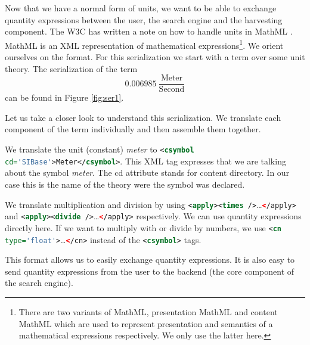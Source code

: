 Now that we have a normal form of units, we want to be able to exchange quantity expressions between the user, the search engine and the harvesting component. The W3C has written a note on how to handle units in MathML \cite{W3C:Unitnnote}. MathML is an XML representation of mathematical expressions\footnote{There are two variants of MathML, presentation MathML and content MathML which are used to represent presentation and semantics of a mathematical expressions respectively. We only use the latter here. }. We orient ourselves on the format. For this serialization we start with a term over some unit theory. The serialization of the term
\[0.006985\ \frac{\text{Meter}}{\text{Second}}\]
can be found in Figure \ref{fig:ser1}.

Let us take a closer look to understand this serialization. We translate each component of the term individually and then assemble them together.

We translate the unit (constant) \textit{meter} to \lstinline[language=XML]{<csymbol cd='SIBase'>Meter</csymbol>}. This XML tag expresses that we are talking about the symbol \textit{meter}. The cd attribute stands for content directory. In our case this is the name of the theory were the symbol was declared.

We translate multiplication and division by using \lstinline[language=XML]{<apply><times />}\dots\lstinline[language=XML]{</apply>} and \lstinline[language=XML]{<apply><divide />}\dots\lstinline[language=XML]{</apply>} respectively. We can use quantity expressions directly here. If we want to multiply with or divide by numbers, we use \lstinline[language=XML]{<cn type='float'>}\dots\lstinline[language=XML]{</cn>} instead of the \lstinline[language=XML]{<csymbol>} tags.

This format allows us to easily exchange quantity expressions. It is also easy to send quantity expressions from the user to the backend (the core component of the search engine).

